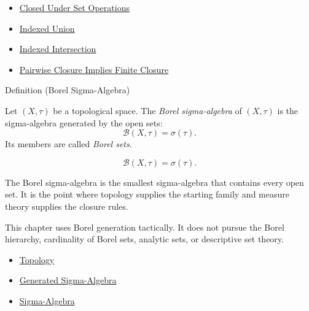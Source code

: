 
\begin{dependencies}
\begin{itemize}
  \item \hyperref[def:closed-under-set-operation-vocabulary]{Closed Under Set Operations}
  \item \hyperref[def:indexed-union]{Indexed Union}
  \item \hyperref[def:indexed-intersection]{Indexed Intersection}
  \item \hyperref[thm:pairwise-closure-implies-finite-closure]{Pairwise Closure Implies Finite Closure}
\end{itemize}
\end{dependencies}

\begin{definitionbox}{Definition (Borel Sigma-Algebra)}
\begin{definition}\label{def:borel-sigma-algebra}
Let \((X,\tau)\) be a topological space.  The \emph{Borel sigma-algebra} of
\((X,\tau)\) is the sigma-algebra generated by the open sets:
\[
  \mathcal B(X,\tau)=\sigma(\tau).
\]
Its members are called \emph{Borel sets}.
\end{definition}
\end{definitionbox}

\begin{remark*}
\[
\mathcal B(X,\tau)=\sigma(\tau).
\]
\end{remark*}

\begin{remark*}[Interpretation]
The Borel sigma-algebra is the smallest sigma-algebra that contains every open
set.  It is the point where topology supplies the starting family and measure
theory supplies the closure rules.
\end{remark*}

\begin{remark*}[Exposition]
This chapter uses Borel generation tactically.  It does not pursue the Borel
hierarchy, cardinality of Borel sets, analytic sets, or descriptive set theory.
\end{remark*}


\begin{dependencies}
\begin{itemize}
  \item \hyperref[def:topology]{Topology}
  \item \hyperref[def:generated-sigma-algebra]{Generated Sigma-Algebra}
  \item \hyperref[def:sigma-algebra]{Sigma-Algebra}
\end{itemize}
\end{dependencies}

